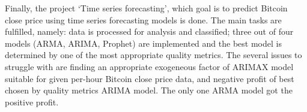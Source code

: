 Finally, the project ‘Time series forecasting’, which goal is to predict Bitcoin close price using time series forecasting models is done. The main tasks are fulfilled, namely: data is processed for analysis and classified; three out of four models (ARMA, ARIMA, Prophet) are implemented and the best model is determined by one of the most appropriate quality metrics. The several issues to struggle with are finding an appropriate exogeneous factor of ARIMAX model suitable for given per-hour Bitcoin close price data, and negative profit of best chosen by quality metrics ARIMA model. The only one ARMA model got the positive profit.